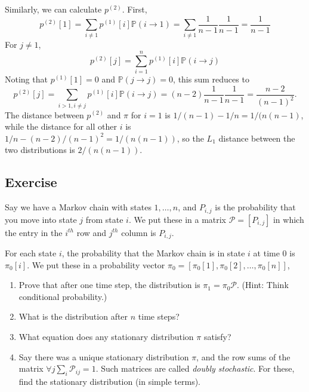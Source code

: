 \documentclass{article}
\newcounter{counter}
\newcommand{\Exercise}{Exercise \stepcounter{counter}\thecounter}
\begin{document}
\begin{enumerate}[label=(\alph*)]
    \vspace{3mm}
    Similarly, we can calculate $p^{(2)}$. First, 
    $$ p^{(2)}[1] = \sum_{i \neq 1} p^{(1)}[i] \mathbb{P}(i \rightarrow 1)  = \sum_{i \neq 1}  \frac{1}{n-1} \frac{1}{n-1} = \frac{1}{n-1}$$
    For $j \neq 1$, 
    $$p^{(2)}[j] = \sum _{i = 1}^{n} p^{(1)}[i] \mathbb{P}(i \rightarrow j)$$
  Noting that $p^{(1)}[1] = 0$ and $\mathbb{P}(j \rightarrow j) = 0$, this sum reduces to 
  $$ p^{(2)}[j]  = \sum_{i > 1, i \neq j}  p^{(1)}[i] \mathbb{P}(i \rightarrow j) = (n-2) \frac{1}{n-1} \frac{1}{n-1} = \frac{n-2}{(n-1)^2}. $$
  The distance between $p^{(2)}$ and $\pi$ for $i = 1$ is $1/(n-1) - 1/n = 1/(n(n-1)$, while the distance for all other $i$ is $1/n - (n-2)/(n-1)^2 = 1/(n(n-1))$, so the $L_1$ distance between the two distributions is $2/(n(n-1))$. 
    \end{enumerate}

\subsection*{\Exercise}
  Say we have a Markov chain with states $1,\ldots, n$, and $P_{i,j}$ is
  the probability that you move into state $j$ from state $i$.
  We put these in a matrix $\mathcal{P} = [ P_{i,j} ]$ in which the entry in
  the $i^{th}$ row and $j^{th}$ column is $P_{i,j}$.

  \vspace{3mm}
  For each state $i$, the probability that the Markov chain is in state $i$
  at time $0$ is $\pi_0[i]$. We put these in a probability vector
  $\pi_0 = [ \pi_0[1], \pi_0[2], \ldots , \pi_0[n]]$,
  \begin{enumerate}[label=(\alph*)]
    \item Prove that after one time step, the distribution is $\pi_1 =
     \pi_0 \mathcal{P}$.
      (Hint: Think conditional probability.)
    \item What is the distribution after $n$ time steps?
    \item What equation does any stationary distribution $\pi$ satisfy?
    \item Say there was a unique stationary distribution $\pi$, and
      the row sums of the matrix $\forall j \sum_i \mathcal{P}_{ij} = 1$.
      Such matrices are called \emph{doubly stochastic}. For these,
      find the stationary distribution (in simple terms).
  \end{enumerate}
  
\end{document}
